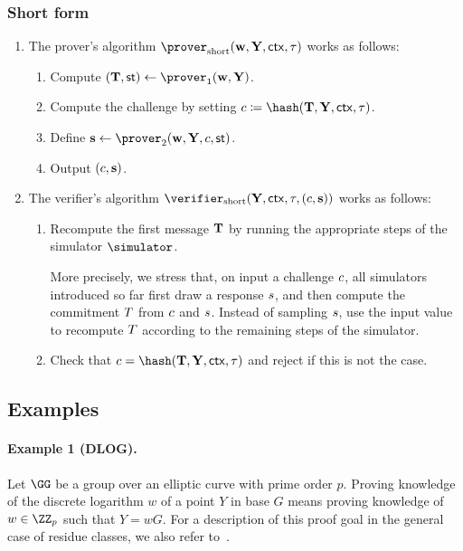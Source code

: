 \documentclass[runningheads,11pt]{article}
\begin{document}
\subsubsection{Short form}
\begin{enumerate}
  \item
    The prover's algorithm $\shortprover(\vec \witness, \vec \statement,\ctx, \stag)$ works as follows:
    \begin{enumerate}
      \item
        Compute $(\vec \commitment,\st)\gets\prover_1(\vec \witness, \vec \statement)$.
      \item
        Compute the challenge by setting $\challenge\defeq\hash(\vec \commitment, \vec \statement,\ctx, \stag)$.
      \item
        Define $\vec \response\gets\prover_2(\vec \witness,\vec \statement, \challenge,\st)$.
      \item
        Output $(c,\mathbf {s})$.
    \end{enumerate}
  \item
    The verifier's algorithm $\shortverifier(\vec \statement, \ctx, \stag, (\challenge, \vec \response))$ works as follows:
    \begin{enumerate}
      \item\label{item:fslong:v:recomputet}
        Recompute the first message $\mathbf {T}$ by running the appropriate steps of the simulator $\simulator$.

         More precisely, we stress that, on input a challenge $c$, all simulators introduced so far first draw a response $s$, and then compute the commitment $T$ from $c$ and $s$.
        Instead of sampling $s$, use the input value to recompute $T$ according to the remaining steps of the simulator.
        \item
        Check that $\challenge=\hash(\vec \commitment, \vec \statement, \ctx, \tau)$ and reject if this is not the case.
    \end{enumerate}
\end{enumerate}

\subsection{Examples}

\paragraph{Example 1 (DLOG).}
Let $\GG$ be a group over an elliptic curve with prime order $p$.
Proving knowledge of the discrete logarithm $w$ of a point $Y$ in base $G$ means proving knowledge of $w\in\ZZ_p$ such that $Y=wG$.
For a description of this proof goal in the general case of residue classes, we also refer to~\cite[1.4.1]{zkproof-reference}.
\end{document}
